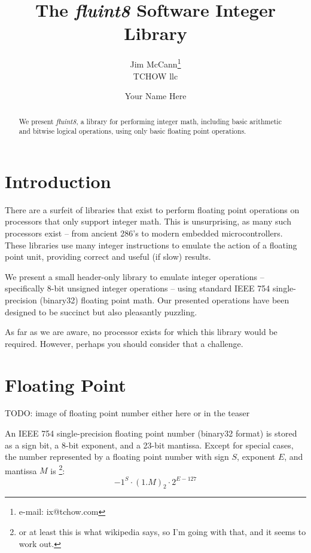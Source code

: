 \documentclass{acmsiggraph}
\title{The {\em fluint8} Software Integer Library}
\author{Jim McCann\thanks{e-mail: ix@tchow.com}\\TCHOW llc \and Your Name Here}
\theoremstyle{remark}
\theoremstyle{definition}
\begin{document}
\maketitle

\begin{abstract}
We present {\em fluint8}, a library for performing integer math, including basic arithmetic and bitwise logical operations, using only basic floating point operations.
\end{abstract}

\begin{CRcatlist}
\end{CRcatlist}

\section{Introduction}
There are a surfeit of libraries that exist to perform floating point operations on processors that only support integer math.
This is unsurprising, as many such processors exist -- from ancient 286's to modern embedded microcontrollers.
These libraries use many integer instructions to emulate the action of a floating point unit, providing correct and useful (if slow) results.

We present a small header-only library to emulate integer operations -- specifically 8-bit unsigned integer operations -- using standard IEEE 754 single-precision (binary32) floating point math.
Our presented operations have been designed to be succinct but also pleasantly puzzling.

As far as we are aware, no processor exists for which this library would be required.
However, perhaps you should consider that a challenge.

\section{Floating Point}
TODO: image of floating point number either here or in the teaser

An IEEE 754 single-precision floating point number (binary32 format) is stored as a sign bit, a 8-bit exponent, and a 23-bit mantissa.
Except for special cases, the number represented by a floating point number with sign $S$, exponent $E$, and mantissa $M$ is
\footnote{or at least this is what wikipedia says, so I'm going with that, and it seems to work out.}:
\begin{displaymath}
-1^{S}\cdot (1.M)_2 \cdot 2^{E-127}
\end{displaymath}
\end{document}
